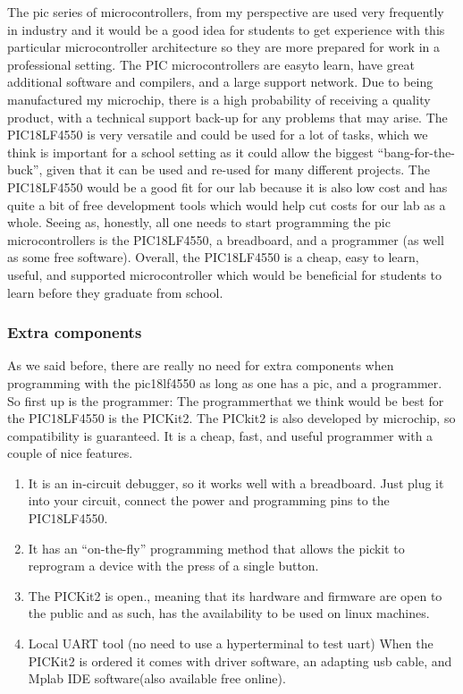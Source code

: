 \documentclass[12pt]{article}
\begin{document}
The pic series of microcontrollers, from my perspective are used very frequently in industry and it
would be a good idea for students to get experience with this particular microcontroller architecture
so they are more prepared for work in a professional setting. The PIC microcontrollers are easyto learn, have great additional software and compilers, and a large support network. Due to being
manufactured my microchip, there is a high probability of receiving a quality product, with a
technical support back-up for any problems that may arise.
The PIC18LF4550 is very versatile and could be used for a lot of tasks, which we think is important
for a school setting as it could allow the biggest “bang-for-the-buck”, given that it can be used and
re-used for many different projects. The PIC18LF4550 would be a good fit for our lab because it
is also low cost and has quite a bit of free development tools which would help cut costs for our lab
as a whole. Seeing as, honestly, all one needs to start programming the pic microcontrollers is the
PIC18LF4550, a breadboard, and a programmer (as well as some free software).
Overall, the PIC18LF4550 is a cheap, easy to learn, useful, and supported microcontroller which
would be beneficial for students to learn before they graduate from school.
\subsubsection{Extra components}
As we said before, there are really no need for extra components when programming with the
pic18lf4550 as long as one has a pic, and a programmer.
So first up is the programmer:
The programmerthat we think would be best for the PIC18LF4550 is the PICKit2.
The PICkit2 is also developed by microchip, so compatibility is guaranteed. It is a cheap, fast, and
useful programmer with a couple of nice features.

\begin{enumerate}
\item It is an in-circuit debugger, so it works well with a breadboard. Just plug it into your circuit,
connect the power and programming pins to the PIC18LF4550.
\item It has an “on-the-fly” programming method that allows the pickit to reprogram a device with the
press of a single button.
\item The PICKit2 is open., meaning that its hardware and firmware are open to the public and as such,
has the availability to be used on linux machines.
\item Local UART tool (no need to use a hyperterminal to test uart)
When the PICKit2 is ordered it comes with driver software, an adapting usb cable, and Mplab IDE
software(also available free online).
\end{enumerate}
\end{document}
